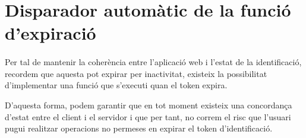 \section{Disparador automàtic de la funció d'expiració}

    \paragraph{}
    Per tal de mantenir la coherència entre l'aplicació web i l'estat de la identificació, recordem que aquesta pot expirar per inactivitat, existeix la possibilitat d'implementar una funció que s'executi quan el token expira.

    D'aquesta forma, podem garantir que en tot moment existeix una concordança d'estat entre el client i el servidor i que per tant, no correm el risc que l'usuari pugui realitzar operacions no permeses en expirar el token d’identificació.
